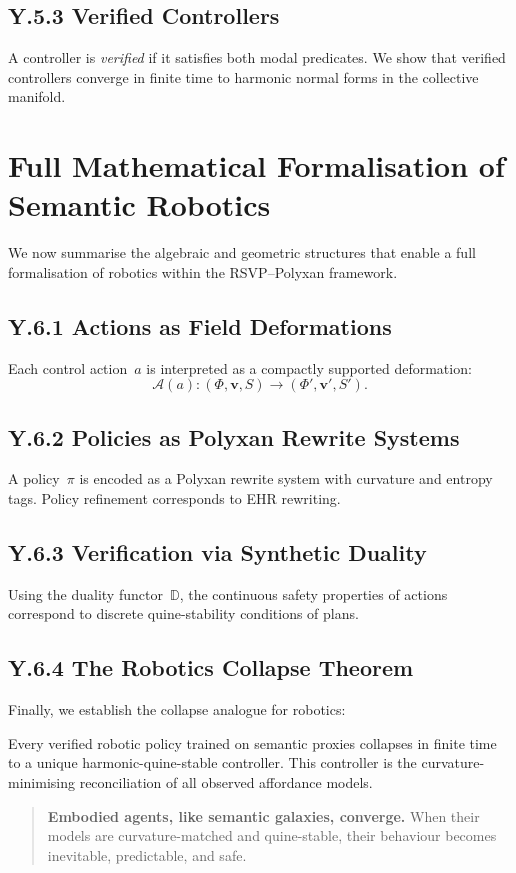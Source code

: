 \subsection{Y.5.3 Verified Controllers}
A controller is \emph{verified} if it satisfies both modal predicates.  
We show that verified controllers converge in finite time to harmonic
normal forms in the collective manifold.


\section{Full Mathematical Formalisation of Semantic Robotics}
\label{sec:Y6}

We now summarise the algebraic and geometric structures that enable a full
formalisation of robotics within the RSVP--Polyxan framework.

\subsection{Y.6.1 Actions as Field Deformations}
Each control action~$a$ is interpreted as a compactly supported deformation:
\[
\mathcal{A}(a) : (\Phi,\mathbf{v},S) \to (\Phi',\mathbf{v}',S').
\]

\subsection{Y.6.2 Policies as Polyxan Rewrite Systems}
A policy~$\pi$ is encoded as a Polyxan rewrite system with curvature and
entropy tags.  
Policy refinement corresponds to EHR rewriting.

\subsection{Y.6.3 Verification via Synthetic Duality}
Using the duality functor~$\mathbb{D}$, the continuous safety properties of
actions correspond to discrete quine-stability conditions of plans.

\subsection{Y.6.4 The Robotics Collapse Theorem}
Finally, we establish the collapse analogue for robotics:

\begin{theorem}
Every verified robotic policy trained on semantic proxies collapses in finite
time to a unique harmonic-quine-stable controller.  
This controller is the curvature-minimising reconciliation of all observed
affordance models.
\end{theorem}

\begin{quote}
\textbf{Embodied agents, like semantic galaxies, converge.}  
When their models are curvature-matched and quine-stable,  
their behaviour becomes inevitable, predictable, and safe.
\end{quote}
